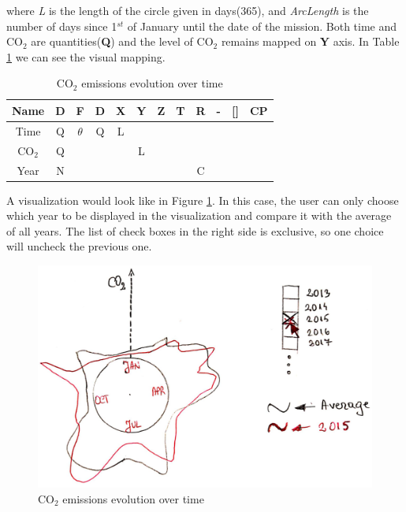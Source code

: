 \documentclass{article}
\begin{document}
where \textit{L} is the length of the circle given in days(365), and \textit{ArcLength} is the number of days since 1$^{st}$ of January until the date of the mission. Both time and CO${_2}$ are quantities(\textbf{Q}) and the level of CO${_2}$ remains mapped on \textbf{Y} axis. In Table \ref{table2} we can see the visual mapping. 

\begin{table}[h!]
	\begin{center}
		\begin{tabular}{|c | c | c | c || c | c | c | c | c| c| c || c|} 
			\hline
			Name & D & F & D\textquotesingle  & X & Y & Z & T & R & -& [] & CP \\ [0.5ex] 
			\hline\hline
			Time  & Q & $\theta$ & Q &  L &   &   &   &   &   &   &   \\ [0.5ex] 
			\hline
			CO${_2}$  & Q &  &  &  & L  &   &   &   &   &   &   \\ [0.5ex] 
			\hline
			Year  & N &  &  &  &   &   &   & C  &   &   &   \\ [0.5ex] 
			\hline
		\end{tabular}
		\caption{CO${_2}$ emissions evolution  over time}
		\label{table2}
	\end{center}
\end{table}

A visualization would look like in Figure \ref{fig:radians_time}. In this case, the user can only choose which year to be displayed in the visualization and compare it with the average of all years. The list of check boxes in the right side is exclusive, so one choice will uncheck the previous one.
\begin{figure}[H]
	\centering
	\includegraphics[scale=0.19]{img/3.jpg}
	\caption{CO${_2}$ emissions evolution over time }
	\label{fig:radians_time}
\end{figure}\
\end{document}
